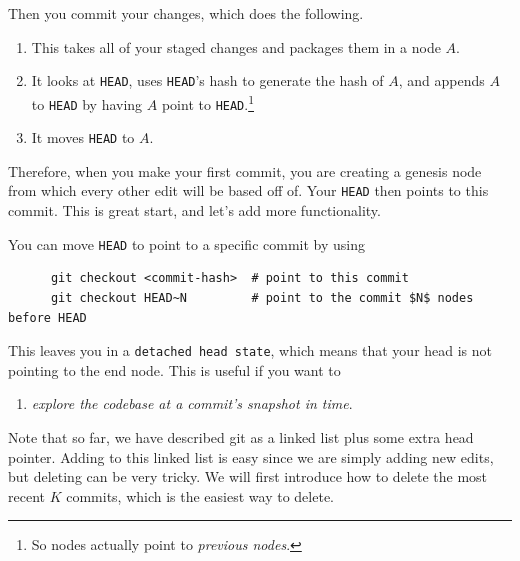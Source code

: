   \begin{definition}[Commit]
    \label{def:commit}
    Then you commit your changes, which does the following. 
    \begin{enumerate}
      \item This takes all of your staged changes and packages them in a node $A$. 
      \item It looks at \texttt{HEAD}, uses \texttt{HEAD}'s hash to generate the hash of $A$, and appends $A$ to \texttt{HEAD} by having $A$ point to \texttt{HEAD}.\footnote{So nodes actually point to \textit{previous nodes}.}
      \item It moves \texttt{HEAD} to $A$. 
    \end{enumerate}
  \end{definition} 

  Therefore, when you make your first commit, you are creating a genesis node from which every other edit will be based off of. Your \texttt{HEAD} then points to this commit. This is great start, and let's add more functionality. 

  \begin{definition}
    \label{def:checkout-a-commit}
    You can move \texttt{HEAD} to point to a specific commit by using 
    \begin{lstlisting}
      git checkout <commit-hash>  # point to this commit  
      git checkout HEAD~N         # point to the commit $N$ nodes before HEAD
    \end{lstlisting} 
    This leaves you in a \texttt{detached head state}, which means that your head is not pointing to the end node. This is useful if you want to 
    \begin{enumerate}
      \item \textit{explore the codebase at a commit's snapshot in time}. 
    \end{enumerate}
  \end{definition} 

  Note that so far, we have described git as a linked list plus some extra head pointer. Adding to this linked list is easy since we are simply adding new edits, but deleting can be very tricky. We will first introduce how to delete the most recent $K$ commits, which is the easiest way to delete. 

